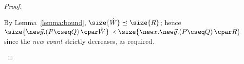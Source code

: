 \documentclass[UKenglish,acmsmall,authorversion]{acmart}
\theoremstyle{plain}
\begin{document}
{\begin{proof}
\begin{enumerate}[label=\textbf{\Alph*},ref=\Alph*,leftmargin=*]
\begin{enumerate}[label*=\textbf{.\arabic*}]
By Lemma~\ref{lemma:bound},
$\size{\hat{W}} \preceq \size{R}$; hence $\size{ \mathopen{\new \vec{y}.} \left( P \cseq Q \right) \cpar \hat{W} } \prec \size{ \mathopen{\new x. \new \vec{y}.} \left( P \cseq Q \right) \cpar R }$ since the \textit{new count} strictly decreases, as required.

\end{enumerate}
\end{enumerate}
\end{proof}}
\end{document}
